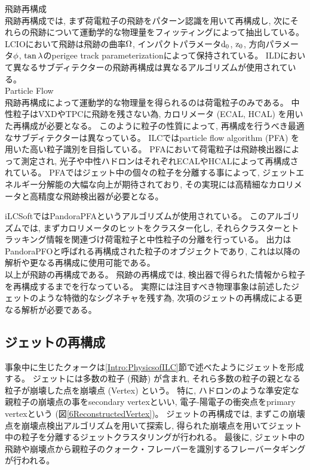 飛跡再構成\\

飛跡再構成では, まず荷電粒子の飛跡をパターン認識を用いて再構成し, 次にそれらの飛跡について運動学的な物理量をフィッティングによって抽出している。
LCIOにおいて飛跡は飛跡の曲率$\rm \Omega$, インパクトパラメータ$\rm d_0$, $\rm z_0$, 方向パラメータ$\rm \phi$, $\rm \tan{\lambda}$のperigee track parameterizationによって保持されている。
ILDにおいて異なるサブディテクターの飛跡再構成は異なるアルゴリズムが使用されている。\\

Particle Flow\\

飛跡再構成によって運動学的な物理量を得られるのは荷電粒子のみである。
中性粒子はVXDやTPCに飛跡を残さない為, カロリメータ (ECAL, HCAL) を用いた再構成が必要となる。
このように粒子の性質によって, 再構成を行うべき最適なサブディテクターは異なっている。
ILCではparticle flow algorithm (PFA) を用いた高い粒子識別を目指している。
PFAにおいて荷電粒子は飛跡検出器によって測定され, 光子や中性ハドロンはそれぞれECALやHCALによって再構成されている。
PFAではジェット中の個々の粒子を分離する事によって, ジェットエネルギー分解能の大幅な向上が期待されており, その実現には高精細なカロリメータと高精度な飛跡検出器が必要となる。

iLCSoftではPandoraPFAというアルゴリズムが使用されている。
このアルゴリズムでは, まずカロリメータのヒットをクラスター化し, それらクラスターとトラッキング情報を関連づけ荷電粒子と中性粒子の分離を行っている。
出力はPandoraPFOと呼ばれる再構成された粒子のオブジェクトであり, これは以降の解析や更なる再構成に使用可能である。\\

以上が飛跡の再構成である。
飛跡の再構成では, 検出器で得られた情報から粒子を再構成するまでを行なっている。
実際には注目すべき物理事象は前述したジェットのような特徴的なシグネチャを残す為, 次項のジェットの再構成による更なる解析が必要である。


\subsection{ジェットの再構成} \label{Intro:SoftERILC:JetReconstruction}

事象中に生じたクォークは\ref{Intro:PhysicsofILC}節で述べたようにジェットを形成する。
ジェットには多数の粒子 (飛跡) が含まれ, それら多数の粒子の親となる粒子が崩壊した点を崩壊点 (Vertex) という。
特に, ハドロンのような準安定な親粒子の崩壊点の事をsecondary vertexといい, 電子-陽電子の衝突点をprimary vertexという (図\ref{6ReconstructedVertex})。
ジェットの再構成では, まずこの崩壊点を崩壊点検出アルゴリズムを用いて探索し, 得られた崩壊点を用いてジェット中の粒子を分離するジェットクラスタリングが行われる。
最後に, ジェット中の飛跡や崩壊点から親粒子のクォーク・フレーバーを識別するフレーバータギングが行われる。

